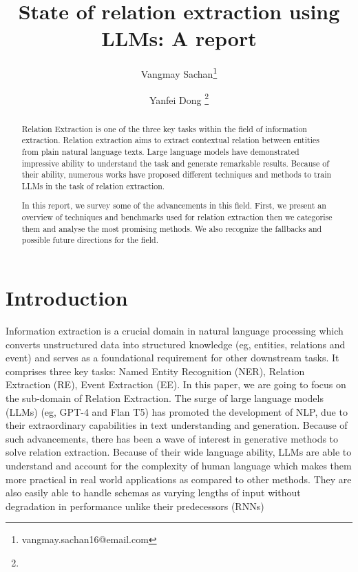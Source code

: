 \documentclass[twocolumn, 11pt]{extarticle}
\begin{document}
\title{State of relation extraction using LLMs: A report }

\author{Vangmay Sachan\thanks{vangmay.sachan16@email.com}}
\author{Yanfei Dong \thanks{}}


\setcounter{Maxaffil}{0}
\renewcommand\Affilfont{\itshape\small}

\date{}  
\maketitle


\begin{abstract}
Relation Extraction is one of the three key tasks within the field of information extraction. Relation extraction aims to extract contextual relation between entities from plain natural language texts. Large language models have demonstrated impressive ability to understand the task and generate remarkable results. Because of their ability, numerous works have proposed different techniques and methods to train LLMs in the task of relation extraction. 

In this report, we survey some of the advancements in this field. First, we present an overview of techniques and benchmarks used for relation extraction then we categorise them and analyse the most promising methods. We also recognize the fallbacks and possible future directions for the field. 

 
\end{abstract}

\section{Introduction}

Information extraction is a crucial domain in natural language processing which converts unstructured data into structured knowledge (eg, entities, relations and event) and serves as a foundational requirement for other downstream tasks. It comprises three key tasks: Named Entity Recognition (NER), Relation Extraction (RE), Event Extraction (EE). In this paper, we are going to focus on the sub-domain of Relation Extraction. The surge of large language models (LLMs) (eg, GPT-4 and Flan T5) has promoted the development of NLP, due to their extraordinary capabilities in text understanding and generation. Because of such advancements, there has been a wave of interest in generative methods to solve relation extraction. Because of their wide language ability, LLMs are able to understand and account for the complexity of human language which makes them more practical in real world applications as compared to other methods. They are also easily able to handle schemas as varying lengths of input without degradation in performance unlike their predecessors (RNNs)
\end{document}
